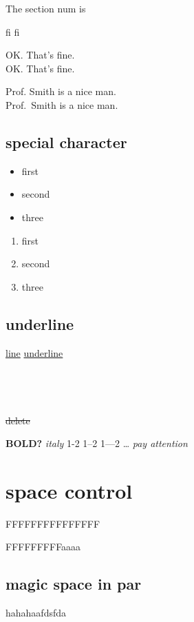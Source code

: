 \documentclass{article}
\begin{document}
The section num is \thesection

fi   f\mbox{}i

OK. That's fine.\\
OK\@. That's fine.

Prof. Smith is a nice man.\\
Prof.~Smith is a nice man.
\subsection{special character}
\XBox \male \female \phone \checked \twonotes

\begin{itemize}
    \item[+] first
    \item[*] second
    \item[\LaTeX] three
\end{itemize}
\begin{enumerate}
    \item first
    \item second
    \item three
\end{enumerate}

\subsection{underline}
\uline{line}
\uline{underline} \\
 \\
 \\
 \\
 \\
\sout{delete} \\

\textbf{BOLD?}
\textit{italy}
1-2
1--2
1---2
\ldots
\emph{pay attention}
\section{space control}

FFFFFFFFFFFFFFF

FFFFFFFFFaaaa

\subsection{magic space in par}


{\parbox[t]{2em}{hahahaafdsfda}}
\end{document}
